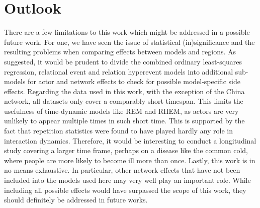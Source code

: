 \chapter{Outlook}
\label{ch:outlook}

There are a few limitations to this work which might be addressed in a possible future work. For one, we have seen the issue of statistical (in)significance and the resulting problems when comparing effects between models and regions. As suggested, it would be prudent to divide the combined ordinary least-squares regression, relational event and relation hyperevent models into additional sub-models for actor and network effects to check for possible model-specific side effects. Regarding the data used in this work, with the exception of the China network, all datasets only cover a comparably short timespan. This limits the usefulness of time-dynamic models like REM and RHEM, as actors are very unlikely to appear multiple times in such short time. This is supported by the fact that repetition statistics were found to have played hardly any role in interaction dynamics. Therefore, it would be interesting to conduct a longitudinal study covering a larger time frame, perhaps on a disease like the common cold, where people are more likely to become ill more than once. Lastly, this work is in no means exhaustive. In particular, other network effects that have not been included into the models used here may very well play an important role. While including all possible effects would have surpassed the scope of this work, they should definitely be addressed in future works.